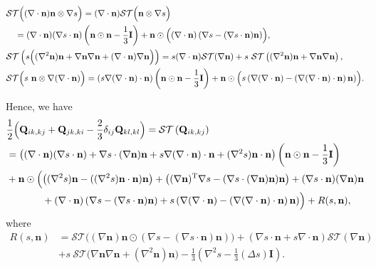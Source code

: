 \documentclass[10pt, a4paper]{article}
\newcommand\n{\mathbf{n}}
\newcommand\Qvec{\mathbf{Q}}
\begin{document}
\begin{appendices}
\begin{equation}
\begin{aligned}
& \mathcal{ST} \Bigl( (\nabla \cdot \n) \n \otimes \nabla s \Bigr) =  (\nabla \cdot \n) \mathcal{ST} \Bigl( \n \otimes \nabla s  \Bigr) \\
& \quad = (\nabla \cdot \n) (\nabla s \cdot \n) \left( \n \odot \n - \frac{1}{3} \mathbf{I} \right) + \n \odot \Bigl( (\nabla \cdot \n) \left( \nabla s - (\nabla s \cdot \n)\n \right) \Bigr), \\
 & \mathcal{ST} \left( s \Bigl( (\nabla^2 \n) \n + \nabla \n \nabla \n + (\nabla \cdot \n) \nabla \n \Bigr) \right) = s (\nabla \cdot \n) \mathcal{ST} (\nabla \n) + s ~ \mathcal{ST} \left( (\nabla^2 \n) \n + \nabla \n \nabla \n  \right), \\
& \mathcal{ST} \Bigl( s ~ \n \otimes \nabla(\nabla \cdot \n) \Bigr) %
= \left( s \nabla(\nabla \cdot \n) \cdot \n \right) \left( \n \odot \n - \frac{1}{3} \mathbf{I}   \right) + \n \odot \Bigl( s \left( \nabla(\nabla \cdot \n) - \left( \nabla(\nabla \cdot \n) \cdot \n \right) \n \right)  \Bigr). \\
\end{aligned}
\end{equation}


Hence, we have
\begin{equation}
  \begin{aligned}
    & \frac{1}{2} \Bigl( \Qvec_{ik,kj}  + \Qvec_{jk,ki} - \frac{2}{3} \delta_{ij} \Qvec_{kl, kl} \Bigr) = \mathcal{ST} \left( \Qvec_{ik, kj} \right) \\
    & =  \left( (\nabla \cdot \n) (\nabla s \cdot \n) + \nabla s \cdot (\nabla \n) \n + s \nabla (\nabla \cdot \n) \cdot \n + (\nabla^2 s) \n \cdot \n \right) \left(\n \odot  \n - \frac{1}{3} \mathbf{I} \right)\\
    & + \n \odot \Bigl( \left( (\nabla^2 s) \n - ((\nabla^2 s) \n \cdot \n) \n \right) + \left( (\nabla \n)^{\mathrm{T}} \nabla s - (\nabla s \cdot (\nabla \n) \n) \n \right) + (\nabla s \cdot \n)  (\nabla \n) \n  \\
    & ~~~~~~~~~~~ + (\nabla \cdot \n) \left( \nabla s - (\nabla s \cdot \n) \n \right) + s \left( \nabla (\nabla \cdot \n) -  \left( \nabla (\nabla \cdot \n) \cdot \n \right) \n \right) \Bigr) + R(s, \n), \\
  \end{aligned}
\end{equation}
 where
\begin{equation}
  \begin{aligned}
 R(s, \n) & = \mathcal{ST}  \bigl( (\nabla \n) \n \odot (\nabla s - (\nabla s \cdot \n)  \n ) \bigr)  + (\nabla s \cdot \n + s \nabla \cdot \n) \mathcal{ST}(\nabla \n)  \\
      & + s~ \mathcal{ST} \bigl( \nabla \n \nabla \n + (\nabla^2 \n)\n \bigr) - \frac{1}{3} \left( \nabla^2 s - \frac{1}{3} (\Delta s) \mathbf{I} \right). \\
  \end{aligned}
\end{equation}


\end{appendices}
\end{document}
